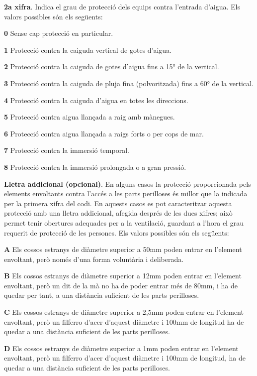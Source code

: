 \textbf{2a xifra}. Indica el grau de protecció dels equips contra
l'entrada d'aigua. Els valors possibles són els següents:
\begin{list}{}
   {\setlength{\labelwidth}{10mm} \setlength{\leftmargin}{10mm} \setlength{\labelsep}{2mm}}
   \item[\textbf{0}] Sense cap protecció en particular.
   \item[\textbf{1}] Protecció contra la caiguda vertical de gotes d'aigua.
   \item[\textbf{2}] Protecció contra la caiguda de gotes d'aigua fins a \ang{15} de la  vertical.
   \item[\textbf{3}] Protecció contra la caiguda de pluja fina (polvoritzada) fins a \ang{60} de la  vertical.
   \item[\textbf{4}] Protecció contra la caiguda d'aigua en totes les direccions.
   \item[\textbf{5}] Protecció contra aigua llançada a raig amb mànegues.
   \item[\textbf{6}] Protecció contra aigua llançada a raigs forts o per cops de mar.
   \item[\textbf{7}] Protecció contra la immersió temporal.
   \item[\textbf{8}] Protecció contra la immersió prolongada o a gran pressió.
\end{list}


\textbf{Lletra addicional (opcional)}. En alguns casos la protecció
proporcionada pels elements envoltants contra l'accés a les parts
perilloses és millor que la indicada per la primera xifra del codi.
En aquests casos es pot caracteritzar aquesta protecció amb una
lletra addicional, afegida després de les dues xifres; això permet
tenir obertures adequades per a la ventilació,  guardant a l'hora el
grau requerit de protecció de les persones. Els valors possibles són
els següents:
\begin{list}{}
   {\setlength{\labelwidth}{10mm} \setlength{\leftmargin}{10mm} \setlength{\labelsep}{2mm}}
   \item[\textbf{A}] Els  cossos estranys de diàmetre superior a
   50\unit{mm}    poden entrar en l'element envoltant, però només d'una forma voluntària i deliberada.
   \item[\textbf{B}] Els  cossos estranys de diàmetre superior a 12\unit{mm}
    poden entrar en l'element envoltant, però un dit de la mà no ha de poder entrar més de 80\unit{mm}, i
    ha de quedar per tant, a una distància    suficient de les parts perilloses.
   \item[\textbf{C}] Els  cossos estranys de diàmetre superior a 2,5\unit{mm}
   poden entrar en l'element envoltant, però un filferro d'acer d'aquest diàmetre i 100\unit{mm}
   de longitud ha de quedar a una distància suficient de les parts perilloses.
   \item[\textbf{D}] Els  cossos estranys de diàmetre superior a 1\unit{mm}
   poden entrar en l'element envoltant, però un filferro d'acer d'aquest diàmetre i 100\unit{mm}
   de longitud, ha de quedar a una distància suficient de les parts perilloses.
\end{list}

